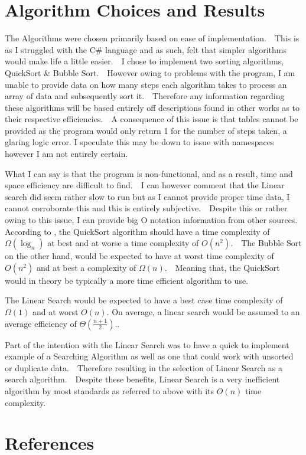 \documentclass[11pt]{article} %
\begin{document}
\section{Algorithm Choices and Results}
The Algorithms were chosen primarily based on ease of implementation.~~This is as I struggled with the C\# language and as such, felt that simpler algorithms would make life a little easier.~~I chose to implement two sorting algorithms, QuickSort \& Bubble Sort.~~However owing to problems with the program, I am unable to provide data on how many steps each algorithm takes to process an array of data and subsequently sort it.~~Therefore any information regarding these algorithms will be based entirely off descriptions found in other works as to their respective efficiencies.~~A consequence of this issue is that tables cannot be provided as the program would only return 1 for the number of steps taken, a glaring logic error. I speculate this may be down to issue with namespaces however I am not entirely certain.~~\par
What I can say is that the program is non-functional, and as a result, time and space efficiency are difficult to find.~~I can however comment that the Linear search did seem rather slow to run but as I cannot provide proper time data, I cannot corroborate this and this is entirely subjective.~~Despite this or rather owing to this issue, I can provide big O notation information from other sources. According to \autocite[1]{dorantes_quicksort_2022}, the QuickSort algorithm should have a time complexity of $\Omega(\log_n)$ at best and at worse a time complexity of $O(n^2)$.~~The Bubble Sort on the other hand, would be expected to have at worst time complexity of $O(n^2)$ and at best a complexity of $\Omega(n)$.~~Meaning that, the QuickSort would in theory be typically a more time efficient algorithm to use.\autocite[1]{noauthor_bubble_2022}\par
The Linear Search would be expected to have a best case time complexity of $\Omega(1)$ and at worst $O(n)$. On average, a linear search would be assumed to an average efficiency of $\Theta(\frac{n+1}{2})$.\autocite[1]{noauthor_linear_2022}.~~\par
Part of the intention with the Linear Search was to have a quick to implement example of a Searching Algorithm as well as one that could work with unsorted or duplicate data.~~Therefore resulting in the selection of Linear Search as a search algorithm.~~Despite these benefits, Linear Search is a very inefficient algorithm by most standards as referred to above with its $O(n)$ time complexity.~~\par
\newpage
\section{References}

\printbibliography
\end{document}

